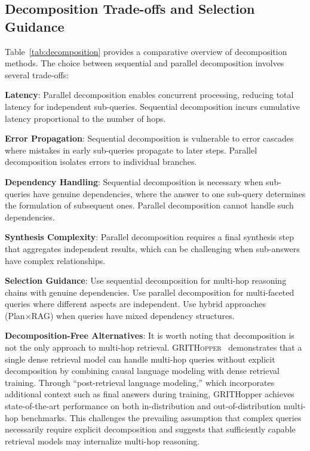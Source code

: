 \documentclass{article}
\begin{document}
\subsection{Decomposition Trade-offs and Selection Guidance}

Table~\ref{tab:decomposition} provides a comparative overview of decomposition methods. The choice between sequential and parallel decomposition involves several trade-offs:

\textbf{Latency}: Parallel decomposition enables concurrent processing, reducing total latency for independent sub-queries. Sequential decomposition incurs cumulative latency proportional to the number of hops.

\textbf{Error Propagation}: Sequential decomposition is vulnerable to error cascades where mistakes in early sub-queries propagate to later steps. Parallel decomposition isolates errors to individual branches.

\textbf{Dependency Handling}: Sequential decomposition is necessary when sub-queries have genuine dependencies, where the answer to one sub-query determines the formulation of subsequent ones. Parallel decomposition cannot handle such dependencies.

\textbf{Synthesis Complexity}: Parallel decomposition requires a final synthesis step that aggregates independent results, which can be challenging when sub-answers have complex relationships.

\textbf{Selection Guidance}: Use sequential decomposition for multi-hop reasoning chains with genuine dependencies. Use parallel decomposition for multi-faceted queries where different aspects are independent. Use hybrid approaches (Plan×RAG) when queries have mixed dependency structures.

\textbf{Decomposition-Free Alternatives}: It is worth noting that decomposition is not the only approach to multi-hop retrieval. \textsc{GRITHopper}~\citep{GRITHopper} demonstrates that a single dense retrieval model can handle multi-hop queries without explicit decomposition by combining causal language modeling with dense retrieval training. Through ``post-retrieval language modeling,'' which incorporates additional context such as final answers during training, GRITHopper achieves state-of-the-art performance on both in-distribution and out-of-distribution multi-hop benchmarks. This challenges the prevailing assumption that complex queries necessarily require explicit decomposition and suggests that sufficiently capable retrieval models may internalize multi-hop reasoning.
\end{document}
